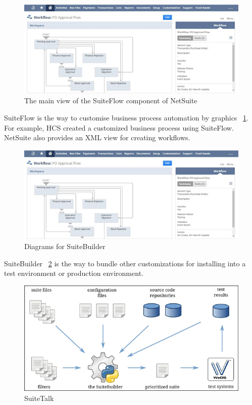 \begin{figure}[!htb]
    \centering 
    \includegraphics[scale=0.7]{resource/suiteFlow.png}
    \caption{The main view of the SuiteFlow component of NetSuite}
    \label{figure:suiteFlow}
\end{figure}

SuiteFlow is the way to customise business process automation by graphics ~\ref{figure:suiteFlow}. For example, HCS created a customized business process using SuiteFlow. NetSuite also provides an XML view for creating workflows.

\begin{figure}[!htb]
    \centering 
    \includegraphics[scale=0.7]{resource/suiteFlow.png}
    \caption{Diagrams for SuiteBuilder}
    \label{figure:suiteBuilder}
\end{figure}


SuiteBuilder ~\ref{figure:suiteBuilder} is the way to bundle other customizations for installing into a test environment or production environment.

\begin{figure}[!htb]
    \centering 
    \includegraphics[scale=0.7]{resource/suiteTalk.png}
    \caption{SuiteTalk}
    \label{figure:suiteTalk}
\end{figure}

